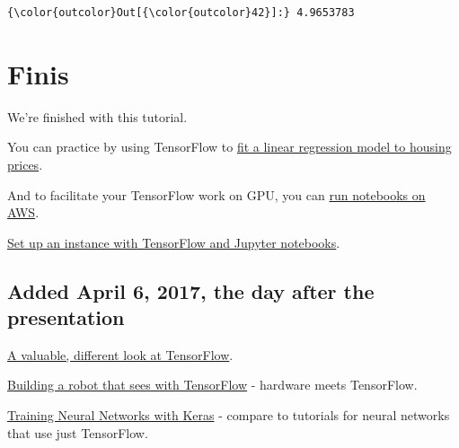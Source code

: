 \documentclass[11pt]{article}
\begin{document}
\begin{Verbatim}[commandchars=\\\{\}]
{\color{outcolor}Out[{\color{outcolor}42}]:} 4.9653783
\end{Verbatim}
            
    \hypertarget{finis}{%
\section{Finis}\label{finis}}

We're finished with this tutorial.

You can practice by using TensorFlow to
\href{http://www.learndatasci.com/predicting-housing-prices-linear-regression-using-python-pandas-statsmodels/}{fit
a linear regression model to housing prices}.

And to facilitate your TensorFlow work on GPU, you can
\href{https://blog.keras.io/running-jupyter-notebooks-on-gpu-on-aws-a-starter-guide.html}{run
notebooks on AWS}.

\href{https://medium.com/@vamsiramakrishnan/setup-a-cloud-based-machine-learning-system-from-scratch-aws-ec2-g-2x2-9216449d558d}{Set
up an instance with TensorFlow and Jupyter notebooks}.

\hypertarget{added-april-6-2017-the-day-after-the-presentation}{%
\subsection{Added April 6, 2017, the day after the
presentation}\label{added-april-6-2017-the-day-after-the-presentation}}

\href{https://www.oreilly.com/learning/hello-tensorflow}{A valuable,
different look at TensorFlow}.

\href{https://www.oreilly.com/learning/how-to-build-a-robot-that-sees-with-100-and-tensorflow}{Building
a robot that sees with TensorFlow} - hardware meets TensorFlow.

\href{https://www.packtpub.com/books/content/training-neural-networks-efficiently-using-keras}{Training
Neural Networks with Keras} - compare to tutorials for neural networks
that use just TensorFlow.


    
    
    
    
\end{document}
